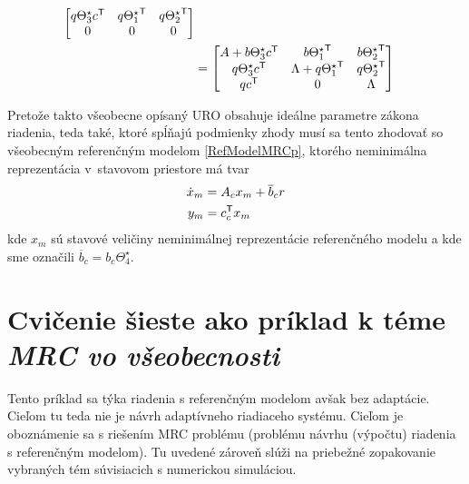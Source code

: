 \documentclass[a4paper, 10pt, ]{article}
\begin{document}
\begin{equation}
\begin{split}
\begin{bmatrix}
			q \Theta_3^\star c^{\mathsf{T}} & q {\Theta_1^\star}^{\mathsf{T}} & q {\Theta_2^\star}^{\mathsf{T}} \\
			0 & 0 & 0
		\end{bmatrix} \\
		&=
		\begin{bmatrix}
             A +  b \Theta_3^\star c^{\mathsf{T}}&
	    	 b {\Theta_1^\star}^{\mathsf{T}} &
	    	 b {\Theta_2^\star}^{\mathsf{T}} \\
	    	 q \Theta_3^\star c^{\mathsf{T}} &
	    	 \Lambda + q {\Theta_1^\star}^{\mathsf{T}} &
	    	 q {\Theta_2^\star}^{\mathsf{T}} \\
	    	 q c^{\mathsf{T}} & 0 & \Lambda
	 	\end{bmatrix}
	\end{split}
\end{equation}

Pretože takto všeobecne opísaný URO obsahuje ideálne parametre zákona riadenia, teda také, ktoré spĺňajú podmienky zhody musí sa tento zhodovať so všeobecným referenčným modelom \eqref{RefModelMRCp}, ktorého neminimálna reprezentácia v~stavovom priestore má tvar
\begin{subequations} \label{vsNeminimalRMMRCp}
	\begin{align}
		\dot x_m &= A_c x_m + \overline{b}_c r \\
		y_m &= c_c^{\mathsf{T}} x_m
	\end{align}
\end{subequations}
kde $x_m$ sú stavové veličiny neminimálnej reprezentácie referenčného modelu a kde sme označili $\overline{b}_c = b_c \Theta_4^\star$.





















\section{Cvičenie šieste ako príklad k téme \emph{MRC vo všeobecnosti}}
\label{pkTMRC}



Tento príklad sa týka riadenia s referenčným modelom avšak bez adaptácie. Cieľom tu teda nie je návrh adaptívneho riadiaceho systému. Cieľom je oboznámenie sa s riešením MRC problému (problému návrhu (výpočtu) riadenia s referenčným modelom). Tu uvedené zároveň slúži na priebežné zopakovanie vybraných tém súvisiacich s numerickou simuláciou.
\end{document}
